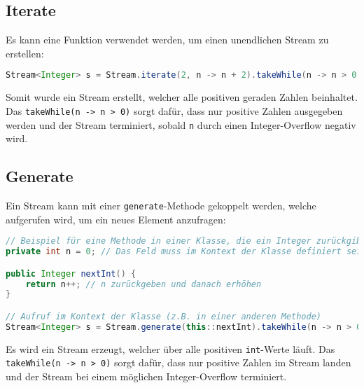 \subsection{Iterate}

Es kann eine Funktion verwendet werden, um einen unendlichen Stream zu erstellen:

\begin{lstlisting}[language=Java, caption={Unendlicher Stream mit Iterate}]
Stream<Integer> s = Stream.iterate(2, n -> n + 2).takeWhile(n -> n > 0);
\end{lstlisting}

Somit wurde ein Stream erstellt, welcher alle positiven geraden Zahlen beinhaltet.
Das \lstinline{takeWhile(n -> n > 0)} sorgt dafür, dass nur positive Zahlen ausgegeben werden und der Stream terminiert, sobald \texttt{n} durch einen Integer-Overflow negativ wird.

\subsection{Generate}

Ein Stream kann mit einer \lstinline{generate}-Methode gekoppelt werden, welche aufgerufen wird, um ein neues Element anzufragen:

\begin{lstlisting}[language=Java, caption={Unendlicher Stream mit Generate}]
// Beispiel für eine Methode in einer Klasse, die ein Integer zurückgibt
private int n = 0; // Das Feld muss im Kontext der Klasse definiert sein

public Integer nextInt() {
    return n++; // n zurückgeben und danach erhöhen
}

// Aufruf im Kontext der Klasse (z.B. in einer anderen Methode)
Stream<Integer> s = Stream.generate(this::nextInt).takeWhile(n -> n > 0);
\end{lstlisting}

Es wird ein Stream erzeugt, welcher über alle positiven \texttt{int}-Werte läuft.
Das \lstinline{takeWhile(n -> n > 0)} sorgt dafür, dass nur positive Zahlen im Stream landen und der Stream bei einem möglichen Integer-Overflow terminiert.